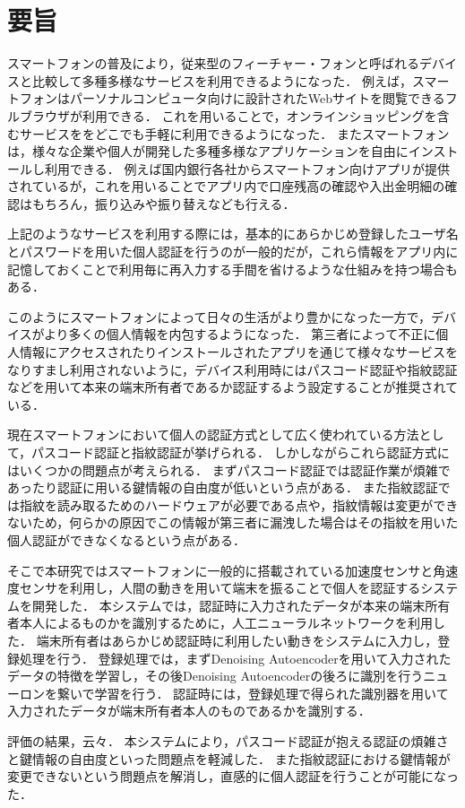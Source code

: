 \chapter*{要旨}
スマートフォンの普及により，従来型のフィーチャー・フォンと呼ばれるデバイスと比較して多種多様なサービスを利用できるようになった．
例えば，スマートフォンはパーソナルコンピュータ向けに設計されたWebサイトを閲覧できるフルブラウザが利用できる．
これを用いることで，オンラインショッピングを含むサービスををどこでも手軽に利用できるようになった．
またスマートフォンは，様々な企業や個人が開発した多種多様なアプリケーションを自由にインストールし利用できる．
例えば国内銀行各社からスマートフォン向けアプリが提供されているが，これを用いることでアプリ内で口座残高の確認や入出金明細の確認はもちろん，振り込みや振り替えなども行える．

上記のようなサービスを利用する際には，基本的にあらかじめ登録したユーザ名とパスワードを用いた個人認証を行うのが一般的だが，これら情報をアプリ内に記憶しておくことで利用毎に再入力する手間を省けるような仕組みを持つ場合もある．

このようにスマートフォンによって日々の生活がより豊かになった一方で，デバイスがより多くの個人情報を内包するようになった．
第三者によって不正に個人情報にアクセスされたりインストールされたアプリを通じて様々なサービスをなりすまし利用されないように，デバイス利用時にはパスコード認証や指紋認証などを用いて本来の端末所有者であるか認証するよう設定することが推奨されている．

現在スマートフォンにおいて個人の認証方式として広く使われている方法として，パスコード認証と指紋認証が挙げられる．
しかしながらこれら認証方式にはいくつかの問題点が考えられる．
まずパスコード認証では認証作業が煩雑であったり認証に用いる鍵情報の自由度が低いという点がある．
また指紋認証では指紋を読み取るためのハードウェアが必要である点や，指紋情報は変更ができないため，何らかの原因でこの情報が第三者に漏洩した場合はその指紋を用いた個人認証ができなくなるという点がある．

そこで本研究ではスマートフォンに一般的に搭載されている加速度センサと角速度センサを利用し，人間の動きを用いて端末を振ることで個人を認証するシステムを開発した．
本システムでは，認証時に入力されたデータが本来の端末所有者本人によるものかを識別するために，人工ニューラルネットワークを利用した．
端末所有者はあらかじめ認証時に利用したい動きをシステムに入力し，登録処理を行う．
登録処理では，まずDenoising Autoencoderを用いて入力されたデータの特徴を学習し，その後Denoising Autoencoderの後ろに識別を行うニューロンを繋いで学習を行う．
認証時には，登録処理で得られた識別器を用いて入力されたデータが端末所有者本人のものであるかを識別する．

評価の結果，云々．
本システムにより，パスコード認証が抱える認証の煩雑さと鍵情報の自由度といった問題点を軽減した．
また指紋認証における鍵情報が変更できないという問題点を解消し，直感的に個人認証を行うことが可能になった．
